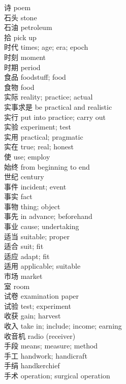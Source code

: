诗 \quad poem\\
石头 \quad stone\\
石油 \quad petroleum\\
拾 \quad pick up\\
时代 \quad times; age; era; epoch\\
时刻 \quad moment\\
时期 \quad period\\
食品 \quad foodstuff; food\\
食物 \quad food\\
实际 \quad reality; practice; actual\\
实事求是 \quad be practical and realistic\\
实行 \quad put into practice; carry out\\
实验 \quad experiment; test\\
实用 \quad practical; pragmatic\\
实在 \quad true; real; honest\\
使 \quad use; employ\\
始终 \quad from beginning to end\\
世纪 \quad century\\
事件 \quad incident; event\\
事实 \quad fact\\
事物 \quad thing; object\\
事先 \quad in advance; beforehand\\
事业 \quad cause; undertaking\\
适当 \quad suitable; proper\\
适合 \quad suit; fit\\
适应 \quad adapt; fit\\
适用 \quad applicable; suitable\\
市场 \quad market\\
室 \quad room\\
试卷 \quad examination paper\\
试验 \quad test; experiment\\
收获 \quad gain; harvest\\
收入 \quad take in; include; income; earning\\
收音机 \quad radio (receiver)\\
手段 \quad means; measure; method\\
手工 \quad handwork; handicraft\\
手绢 \quad handkerchief\\
手术 \quad operation; surgical operation\\
